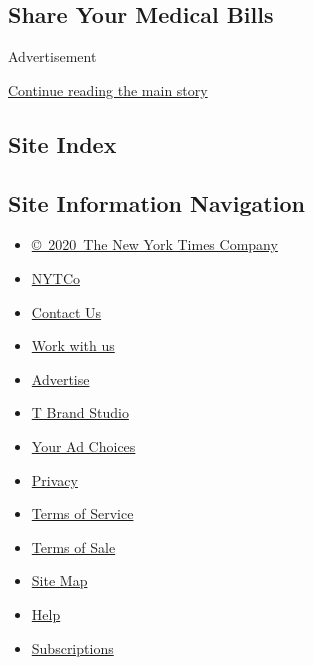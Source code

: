 \hypertarget{share-your-medical-bills}{%
\subsection{Share Your Medical Bills}\label{share-your-medical-bills}}

Advertisement

\protect\hyperlink{after-bottom}{Continue reading the main story}

\hypertarget{site-index}{%
\subsection{Site Index}\label{site-index}}

\hypertarget{site-information-navigation}{%
\subsection{Site Information
Navigation}\label{site-information-navigation}}

\begin{itemize}
\tightlist
\item
  \href{https://help.nytimes3xbfgragh.onion/hc/en-us/articles/115014792127-Copyright-notice}{©~2020~The
  New York Times Company}
\end{itemize}

\begin{itemize}
\tightlist
\item
  \href{https://www.nytco.com/}{NYTCo}
\item
  \href{https://help.nytimes3xbfgragh.onion/hc/en-us/articles/115015385887-Contact-Us}{Contact
  Us}
\item
  \href{https://www.nytco.com/careers/}{Work with us}
\item
  \href{https://nytmediakit.com/}{Advertise}
\item
  \href{http://www.tbrandstudio.com/}{T Brand Studio}
\item
  \href{https://www.nytimes3xbfgragh.onion/privacy/cookie-policy\#how-do-i-manage-trackers}{Your
  Ad Choices}
\item
  \href{https://www.nytimes3xbfgragh.onion/privacy}{Privacy}
\item
  \href{https://help.nytimes3xbfgragh.onion/hc/en-us/articles/115014893428-Terms-of-service}{Terms
  of Service}
\item
  \href{https://help.nytimes3xbfgragh.onion/hc/en-us/articles/115014893968-Terms-of-sale}{Terms
  of Sale}
\item
  \href{https://spiderbites.nytimes3xbfgragh.onion}{Site Map}
\item
  \href{https://help.nytimes3xbfgragh.onion/hc/en-us}{Help}
\item
  \href{https://www.nytimes3xbfgragh.onion/subscription?campaignId=37WXW}{Subscriptions}
\end{itemize}
